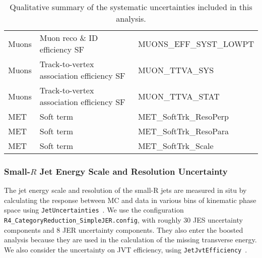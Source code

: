\begin{table}[!hp]
\begin{center}
\begin{tabular}{|l|l|l|}
      Muons         & Muon reco \& ID efficiency SF               &   MUONS\_EFF\_SYST\_LOWPT           \\
      Muons         & Track-to-vertex association efficiency SF         &   MUON\_TTVA\_SYS             \\
      Muons         & Track-to-vertex association efficiency SF         &   MUON\_TTVA\_STAT            \\ \hline
      MET           & Soft term                       &   MET\_SoftTrk\_ResoPerp                        \\
      MET           & Soft term                       &   MET\_SoftTrk\_ResoPara                        \\
      MET           & Soft term                       &   MET\_SoftTrk\_Scale                           \\ \hline
      \end{tabular}
      \caption{ Qualitative summary of the systematic uncertainties included in this analysis. }
      \label{tab:syst_summary_sources_2}
    \end{center}
  \end{table}

\subsubsection*{Small-$R$ Jet Energy Scale and Resolution Uncertainty}
  The jet energy scale and resolution of the small-R jets are measured in situ by calculating
the response between MC and data in various bins of kinematic phase space using \texttt{JetUncertainties}~\cite{JetUncertainties}.
We use the configuration \texttt{R4\_CategoryReduction\_SimpleJER.config},
with roughly 30 JES uncertainty components and 8 JER uncertainty components.
They also enter the boosted analysis because they are used in the calculation of the missing transverse energy.
We also consider the uncertainty on JVT efficiency, using \texttt{JetJvtEfficiency}~\cite{JVTCalib}.

